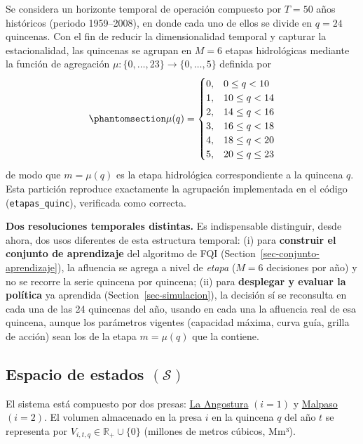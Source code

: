 \documentclass[
  letterpaper,
  DIV=11,
  numbers=noendperiod]{scrreprt}
\theoremstyle{definition}
\theoremstyle{remark}
\begin{document}
Se considera un horizonte temporal de operación compuesto por \(T = 50\)
años históricos (periodo 1959--2008), en donde cada uno de ellos se
divide en \(q = 24\) quincenas. Con el fin de reducir la dimensionalidad
temporal y capturar la estacionalidad, las quincenas se agrupan en
\(M = 6\) etapas hidrológicas mediante la función de agregación
\(\mu: \{0,\dots,23\} \to \{0,\dots,5\}\) definida por
\begin{equation}\protect\phantomsection\label{eq-etapas}{\mu(q) = \begin{cases} 0, & 0 \leq q <10\\ 1, & 10 \leq q <14\\ 2, & 14 \leq q < 16\\ 3, & 16 \leq q < 18\\ 4, & 18 \leq q < 20\\ 5, & 20 \leq q \leq 23\\ \end{cases}}\end{equation}
de modo que \(m = \mu(q)\) es la etapa hidrológica correspondiente a la
quincena \(q.\) Esta partición reproduce exactamente la agrupación
implementada en el código (\texttt{etapas\_quinc}), verificada como
correcta.

\textbf{Dos resoluciones temporales distintas.} Es indispensable
distinguir, desde ahora, dos usos diferentes de esta estructura
temporal: (i) para \textbf{construir el conjunto de aprendizaje} del
algoritmo de FQI (Section~\ref{sec-conjunto-aprendizaje}), la afluencia
se agrega a nivel de \emph{etapa} (\(M=6\) decisiones por año) y no se
recorre la serie quincena por quincena; (ii) para \textbf{desplegar y
evaluar la política} ya aprendida (Section~\ref{sec-simulacion}), la
decisión sí se reconsulta en cada una de las 24 quincenas del año,
usando en cada una la afluencia real de esa quincena, aunque los
parámetros vigentes (capacidad máxima, curva guía, grilla de acción)
sean los de la etapa \(m=\mu(q)\) que la contiene.

\subsection{\texorpdfstring{Espacio de estados
\((\mathcal{S})\)}{Espacio de estados (\textbackslash mathcal\{S\})}}\label{sec-espacio-estados}

El sistema está compuesto por dos presas:
\href{https://maps.app.goo.gl/NHNQdHdfYAoRGxhPA}{La Angostura}
\((i = 1)\) y \href{https://maps.app.goo.gl/acX7hVXswX5uYYUBA}{Malpaso}
\((i =2)\). El volumen almacenado en la presa \(i\) en la quincena \(q\)
del año \(t\) se representa por
\(V_{i,t,q} \in \mathbb{R}_{+} \cup \{0\}\) (millones de metros cúbicos,
Mm³).
\end{document}
